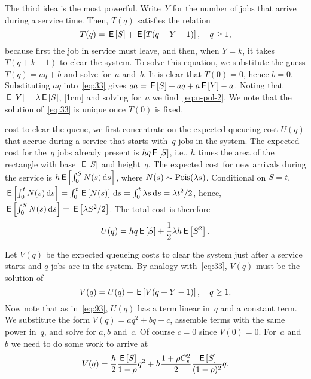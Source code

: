 \documentclass[stochastic-or.tex]{subfiles}
\begin{document}
The third idea is the most powerful.
Write~$Y$ for the number of jobs that arrive during a service time.
Then, $T(q)$ satisfies the relation
\begin{equation}\label{eq:33}
  T(q) = \,\mathsf{E}\left[S\right] + \,\mathsf{E}\left[T(q+Y-1)\right],\quad q\geq 1,
\end{equation}
because first the job in service must leave, and then, when $Y=k$, it takes $T(q+k-1)$ to clear the system.
To solve this equation, we substitute the guess $T(q) = aq+b$ and solve for~$a$ and~$b$.
It is clear that $T(0)=0$, hence $b=0$.
Substituting $a q$ into~\cref{eq:33} gives $q a =\,\mathsf{E}\left[S\right] + aq + a\,\mathsf{E}\left[Y\right] - a$.
Noting that $\,\mathsf{E}\left[Y\right] = \lambda \,\mathsf{E}\left[S\right]$, [1cm]
and solving for~$a$ we find~\cref{eq:n-pol-2}.
We note that the solution of~\cref{eq:33} is unique once $T(0)$ is fixed.




 cost to clear the queue, we first concentrate on the expected queueing cost $U(q)$ that accrue during a service that starts with~$q$ jobs in the system.
The expected cost for the~$q$ jobs already present is $h q \,\mathsf{E}\left[S\right]$, i.e., $h$ times the area of the rectangle with base~$\,\mathsf{E}\left[S\right]$ and height~$q$.
The expected cost for new arrivals during the service is $h \,\mathsf{E}\left[\int_0^{S} N(s) \,\textrm{d}s\right]$, where $N(s)\sim \mathrm{Pois}(\lambda s)$.
Conditional on $S=t$, $\,\mathsf{E}\left[\int_0^{t} N(s) \,\textrm{d}s \right] = \int_{0}^{t} \,\mathsf{E}\left[N(s)\right] \,\textrm{d}s = \int_{0}^{t} \lambda s \,\textrm{d}s = \lambda t^2/2$, hence, $\,\mathsf{E}\left[\int_0^{S} N(s) \,\textrm{d}s\right] = \,\mathsf{E}\left[\lambda S^{2}/2\right]$.
The total cost is therefore
\begin{equation*}
U(q)  =  h q \,\mathsf{E}\left[S\right] +  \frac 12 \lambda h \,\mathsf{E}\left[S^2\right].
\end{equation*}

Let $V(q)$ be the expected queueing costs to clear the system just after a service starts and  $q$ jobs are in the system.
By analogy with~\cref{eq:33}, $V(q)$ must be the solution of
\begin{equation}  \label{eq:98}
  V(q) = U(q) + \,\mathsf{E}\left[V(q+Y-1)\right], \quad q\geq 1.
\end{equation}
Now note that as in~\cref{eq:93}, $U(q)$ has a term linear in~$q$ and a constant term.
We substitute the form $V(q) = aq^2 + bq+c$, assemble terms with the same power in~$q$, and solve for $a, b$ and~$c$.
Of course $c = 0$ since $V(0)=0$.
For~$a$ and~$b$ we need to do some work to arrive at
\begin{align*}
  V(q) = \frac{h}{2}\frac{\,\mathsf{E}\left[S\right]}{1-\rho} q^2 + h  \frac{ 1+ \rho C_s^2}2 \frac{\,\mathsf{E}\left[S\right]}{(1-\rho)^2} q.
\end{align*}
\end{document}
